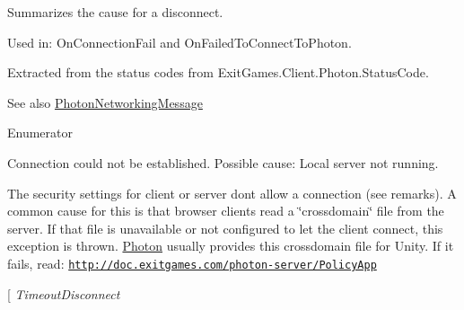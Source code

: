 Summarizes the cause for a disconnect. 

Used in\+: On\+Connection\+Fail and On\+Failed\+To\+Connect\+To\+Photon. 

Extracted from the status codes from Exit\+Games.\+Client.\+Photon.\+Status\+Code.

\begin{DoxySeeAlso}{See also}
\hyperlink{group__public_api_gaf30bbea51cc8c4b1ddc239d1c5c1468f}{Photon\+Networking\+Message}


\end{DoxySeeAlso}
\begin{Desc}
\item[Enumerator]\par
\begin{description}
\item[{\em 
Exception\+On\+Connect\hypertarget{group__public_api_ggad61b1461cf60ad9e8d86923d111d5cc9ae28f71975b160263c7e6438b4b4429ef}{}\label{group__public_api_ggad61b1461cf60ad9e8d86923d111d5cc9ae28f71975b160263c7e6438b4b4429ef}
}]Connection could not be established. Possible cause\+: Local server not running.\item[{\em 
Security\+Exception\+On\+Connect\hypertarget{group__public_api_ggad61b1461cf60ad9e8d86923d111d5cc9a281086f3f83f5f38b4b9a4572b60a368}{}\label{group__public_api_ggad61b1461cf60ad9e8d86923d111d5cc9a281086f3f83f5f38b4b9a4572b60a368}
}]The security settings for client or server don\textquotesingle{}t allow a connection (see remarks). A common cause for this is that browser clients read a \char`\"{}crossdomain\char`\"{} file from the server. If that file is unavailable or not configured to let the client connect, this exception is thrown. \hyperlink{namespace_photon}{Photon} usually provides this crossdomain file for Unity. If it fails, read\+: \href{http://doc.exitgames.com/photon-server/PolicyApp}{\tt http\+://doc.\+exitgames.\+com/photon-\/server/\+Policy\+App} \item[{\em 
Timeout\+Disconnect\hypertarget{group__public_api_ggad61b1461cf60ad9e8d86923d111d5cc9ad376a854099d47f8a5279893e854ec27}{}\label{group__public_api_ggad61b1461cf60ad9e8d86923d111d5cc9ad376a854099d47f8a5279893e854ec27}
}
\end{description}
\end{Desc}
